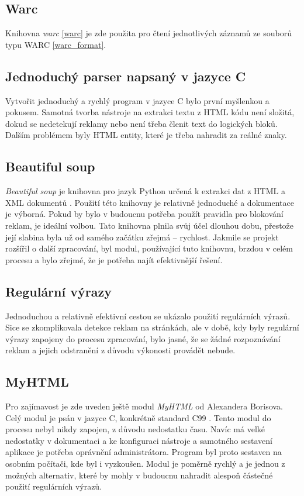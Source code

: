 \subsection{Warc}
Knihovna \textit{warc} \ref{warc} je zde použita pro čtení jednotlivých záznamů ze souborů typu WARC \ref{warc_format}.

\subsection{Jednoduchý parser napsaný v jazyce C}
Vytvořit jednoduchý a rychlý program v jazyce C bylo první myšlenkou a pokusem. Samotná tvorba
nástroje na extrakci textu z HTML kódu není složitá, dokud se nedetekují reklamy nebo není třeba
členit text do logických bloků. Dalším problémem byly HTML entity, které je třeba nahradit za reálné znaky.

\subsection{Beautiful soup}
\textit{Beautiful soup} je knihovna pro jazyk Python určená k extrakci dat z HTML a XML dokumentů \cite{BEATIFULSOUP}.
Použití této knihovny je relativně jednoduché a dokumentace je výborná. Pokud by bylo v budoucnu potřeba použít pravidla pro
blokování reklam, je ideální volbou. Tato knihovna plnila svůj účel dlouhou dobu, přestože její slabina byla už od samého začátku
zřejmá -- rychlost. Jakmile se projekt rozšířil o další zpracování, byl modul, používající tuto knihovnu, brzdou v celém procesu
a bylo zřejmé, že je potřeba najít efektivnější řešení.

\subsection{Regulární výrazy}
Jednoduchou a relativně efektivní cestou se ukázalo použití regulárních výrazů. Sice se zkomplikovala detekce reklam na stránkách,
ale v době, kdy byly regulární výrazy zapojeny do procesu zpracování, bylo jasné, že se žádné rozpoznávání reklam
a jejich odstranění z důvodu výkonosti provádět nebude.

\subsection{MyHTML}
Pro zajímavost je zde uveden ještě modul \textit{MyHTML} od Alexandera Borisova. Celý modul je psán v jazyce C,
konkrétně standard C99 \cite{MyHTML}. Tento modul do procesu nebyl nikdy zapojen, z důvodu nedostatku času. Navíc má
velké nedostatky v dokumentaci a ke konfiguraci nástroje a samotného sestavení aplikace je
potřeba oprávnění administrátora. Program byl proto sestaven na osobním počítači, kde byl i vyzkoušen. Modul je poměrně rychlý
a je jednou z možných alternativ, které by mohly v budoucnu nahradit alespoň částečné použití regulárních výrazů.

